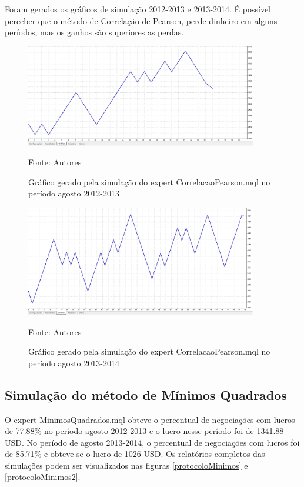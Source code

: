 Foram gerados os gráficos de simulação 2012-2013 e 2013-2014. É possível perceber que o método de Correlação de Pearson, perde dinheiro em alguns períodos, mas os ganhos são superiores as perdas.

\begin{figure}[htp]
\centering
\includegraphics[width=0.9\textwidth]{figuras/protocoloCorrelacao3}
\caption{Gráfico gerado pela simulação do expert CorrelacaoPearson.mql no período agosto 2012-2013}{Fonte: Autores} 
\label{protocoloCorrelacao3}
\end{figure}

\begin{figure}[htp]
\centering
\includegraphics[width=0.9\textwidth]{figuras/protocoloCorrelacao4}
\caption{Gráfico gerado pela simulação do expert CorrelacaoPearson.mql no período agosto 2013-2014}{Fonte: Autores} 
\label{protocoloCorrelacao4}
\end{figure}

\subsection{Simulação do método de Mínimos Quadrados}

O expert MinimosQuadrados.mql obteve o percentual de negociações com lucros de 77.88\% no período agosto 2012-2013 e o  lucro nesse período foi de 1341.88 USD.
 No período de agosto 2013-2014, o percentual de negociações com lucros foi de 85.71\%  e obteve-se o lucro de 1026 USD. 
Os relatórios completos das simulações podem ser visualizados nas figuras \ref{protocoloMinimos} e \ref{protocoloMinimos2}.

